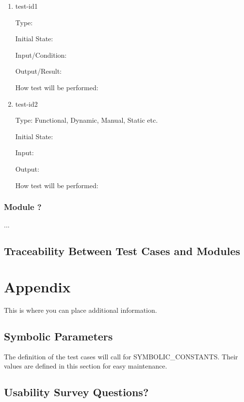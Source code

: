 \documentclass[12pt, titlepage]{article}
\begin{document}
\begin{enumerate}

  \item{test-id1\\}

  Type: 

  Initial State:

  Input/Condition:

  Output/Result:

  How test will be performed:

  \item{test-id2\\}

  Type: Functional, Dynamic, Manual, Static etc.

  Initial State:

  Input:

  Output:

  How test will be performed:

\end{enumerate}

\subsubsection{Module ?}

...

\subsection{Traceability Between Test Cases and Modules}






\newpage

\section{Appendix}

This is where you can place additional information.

\subsection{Symbolic Parameters}

The definition of the test cases will call for SYMBOLIC\_CONSTANTS.
Their values are defined in this section for easy maintenance.

\subsection{Usability Survey Questions?}

\end{document}
